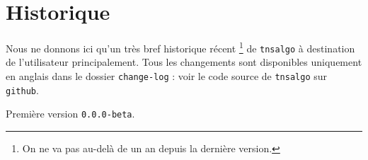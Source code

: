 \documentclass[12pt,a4paper]{article}
\begin{document}
\newpage

\section{Historique}

Nous ne donnons ici qu'un très bref historique récent
\footnote{
	On ne va pas au-delà de un an depuis la dernière version.
}
de \verb+tnsalgo+ à destination de l'utilisateur principalement.
Tous les changements sont disponibles uniquement en anglais dans le dossier \verb+change-log+ : voir le code source de \verb+tnsalgo+ sur \verb+github+.

\begin{description}

    \medskip
    \item[2020-09-12] Première version \verb+0.0.0-beta+.


\end{description}
\end{document}
